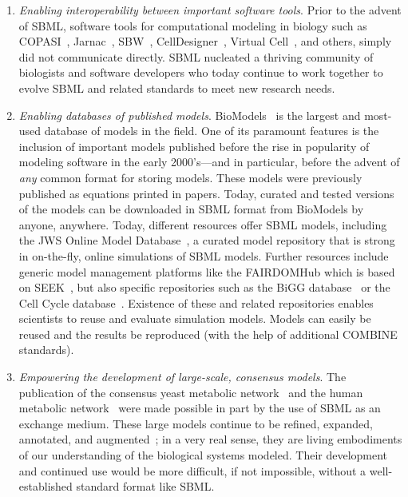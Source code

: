 \begin{enumerate}

\item \emph{Enabling interoperability between important software tools}.  Prior to the advent of SBML, software tools for computational modeling in biology such as COPASI~\cite{hoops_2006, copasiweb}, Jarnac~\cite{sauro_2000, sauro_2000b}, SBW~\cite{Bergmann:2006:SMF:1218112.1218411, hucka_2002d}, CellDesigner~\cite{funahashi_2003, funahashi_2004}, Virtual Cell~\cite{loew_2001, schaff_1999, schaff_2001, shin_1998}, and others, simply did not communicate directly.  SBML nucleated a thriving community of biologists and software developers who today continue to work together to evolve SBML and related standards to meet new research needs.

\item \emph{Enabling databases of published models}.  
BioModels~\cite{li2010biomodels} is the largest and most-used database of models in the field.  One of its paramount features is the inclusion of important models published before the rise in popularity of modeling software in the early 2000's---and in particular, before the advent of \emph{any} common format for storing models.  These models were previously published as equations printed in papers.  Today, curated and tested versions of the models can be downloaded in SBML format from BioModels by anyone, anywhere.
Today, different resources offer SBML models, including the JWS Online Model Database~\cite{olivier2004web}, a curated model repository that is strong in on-the-fly, online simulations of SBML models. 
Further resources include generic model management platforms like the FAIRDOMHub which is based on SEEK~\cite{wolstencroft2015seek}, but also specific repositories such as the BiGG database~\cite{king2016bigg} or the Cell Cycle database~\cite{alfieri2013cell}. 
Existence of these and related repositories enables scientists to reuse and evaluate simulation models. 
Models can easily be reused and the results be reproduced (with the help of additional COMBINE standards). 

\item \emph{Empowering the development of large-scale, consensus models}.  The publication of the consensus yeast metabolic network~\cite{herrgaard2008consensus} and the human metabolic network~\cite{duarte2007global, ma2007edinburgh, thiele2013community} were made possible in part by the use of SBML as an exchange medium.  These large models continue to be refined, expanded, annotated, and augmented~\cite{swainston2013analysis, smallbone2013model}; in a very real sense, they are living embodiments of our understanding of the biological systems modeled.  Their development and continued use would be more difficult, if not impossible, without a well-established standard format like SBML.


\end{enumerate}
